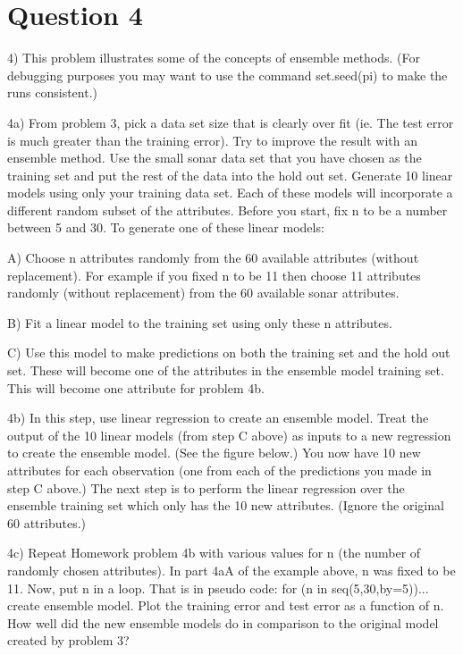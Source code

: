 \documentclass{article}
\begin{document}
\section*{Question 4}

4) This problem illustrates some of the concepts of ensemble methods. (For
debugging purposes you may want to use the command set.seed(pi) to make
the runs consistent.)

4a) From problem 3, pick a data set size that is clearly over fit (ie. The test
error is much greater than the training error). Try to improve the result with an
ensemble method. Use the small sonar data set that you have chosen as the
training set and put the rest of the data into the hold out set. Generate 10
linear models using only your training data set. Each of these models will
incorporate a different random subset of the attributes. Before you start, fix n
to be a number between 5 and 30.
To generate one of these linear models:

A) Choose n attributes randomly from the 60 available attributes
(without replacement). For example if you fixed n to be 11 then
choose 11 attributes randomly (without replacement) from the 60
available sonar attributes.

B) Fit a linear model to the training set using only these n attributes.

C) Use this model to make predictions on both the training set and the
hold out set. These will become one of the attributes in the ensemble
model training set. This will become one attribute for problem 4b.

4b) In this step, use linear regression to create an ensemble model. Treat
the output of the 10 linear models (from step C above) as inputs to a new
regression to create the ensemble model. (See the figure below.) You now
have 10 new attributes for each observation (one from each of the predictions
you made in step C above.) The next step is to perform the linear regression
over the ensemble training set which only has the 10 new attributes. (Ignore
the original 60 attributes.)

4c) Repeat Homework problem 4b with various values for n (the number of
randomly chosen attributes). In part 4aA of the example above, n was fixed to
be 11. Now, put n in a loop. That is in pseudo code:
for (n in seq(5,30,by=5)){... create ensemble model}.
Plot the training error and test error as a function of n. How well did the new
ensemble models do in comparison to the original model created by problem
3?
\end{document}
